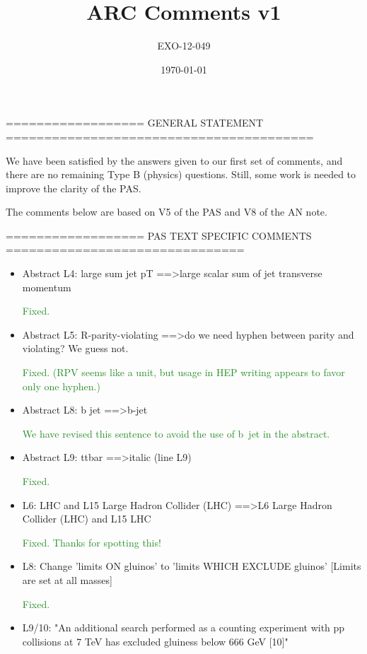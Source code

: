 \documentclass[paper=a4, fontsize=11pt]{scrartcl}
\title{ARC Comments v1}
\author{EXO-12-049}
\date{\today}
\begin{document}
================== GENERAL STATEMENT ======================================== 


We have been satisfied by the answers given to our first set of comments, and 
there are no remaining Type B (physics) questions. Still, some work is needed 
to improve the clarity of the PAS. 


The comments below are based on V5 of the PAS and V8 of the AN note. 


================== PAS TEXT SPECIFIC COMMENTS =============================== 

\begin{itemize}
\item Abstract L4: 
large sum jet pT ==\textgreater large scalar sum of jet transverse momentum 

\textcolor{ForestGreen}{Fixed.}\\

\item Abstract L5: 
R-parity-violating ==\textgreater do we need hyphen between parity and violating? We 
guess not. 

\textcolor{ForestGreen}{Fixed. (RPV seems like a unit, but usage in HEP writing appears to favor only one hyphen.)}\\

\item Abstract L8: 
b jet ==\textgreater b-jet 

\textcolor{ForestGreen}{We have revised this sentence to avoid the use of b~jet
in the abstract.}\\

\item Abstract L9: 
ttbar ==\textgreater italic (line L9) 

\textcolor{ForestGreen}{Fixed.}\\

\item L6: 
LHC and L15 Large Hadron Collider (LHC) 
==\textgreater L6 Large Hadron Collider (LHC) and L15 LHC 

\textcolor{ForestGreen}{Fixed. Thanks for spotting this!}\\

\item L8: 
Change 'limits ON gluinos' to 'limits WHICH EXCLUDE gluinos' 
[Limits are set at all masses] 

\textcolor{ForestGreen}{Fixed.}\\

\item L9/10: 
"An additional search performed as a counting experiment with pp collisions 
at 7 TeV has excluded gluiness below 666 GeV [10]" 


\end{itemize}
\end{document}
